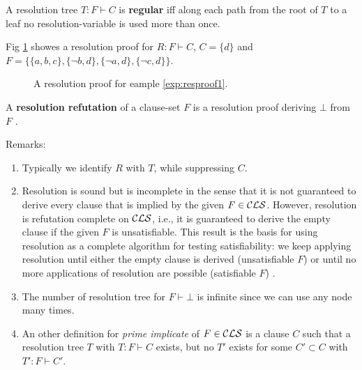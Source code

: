 \documentclass[12pt]{book}
\begin{document}
\begin{defi}\label{def:treg_ree}
   A resolution tree $T : F \vdash C$ is \textbf{regular} iff along each path from the root of $T$ to a leaf 
   no resolution-variable is used more than once. 
\end{defi}
 \begin{examp}\label{exp:resproof1}
      Fig \ref{fig:proof1} showes a resolution proof for  $R: F \vdash C$, $C=\{d\}$ and $F = \{\{a,b,c\},\{\neg b,d\},\{\neg a, d\},\{\neg c, d\}\}$. 
	   \begin{figure}
	   \centering  
	   \caption{A resolution proof for eample  \ref{exp:resproof1}.}
	   \label{fig:proof1}
       \end{figure}
\end{examp}

\begin{defi}\label{def:resrefutation}
  A \textbf{resolution refutation} of a clause-set $F$ is a resolution proof deriving $\bot$ from $F$ \cite{h5}. 
\end{defi}
  
Remarks:
\begin{enumerate}
      \item Typically we identify $R$ with $T$, while suppressing $C$.
	  \item Resolution is sound but is incomplete in the sense that it is not guaranteed to derive every clause that is implied by the given $F \in \mathcal{CLS}$. 
	  However, resolution is refutation complete on $\mathcal{CLS}$, i.e., it is guaranteed to derive the empty clause if the given $F$ is unsatisfiable. 
	  This result is the basis for using resolution as a complete algorithm for testing satisfiability: we keep applying resolution until either 
	  the empty clause is derived (unsatisfiable $F$) or until no more applications of resolution are possible (satisfiable $F$) \cite{h6}.
	  \item The number of resolution tree for $F \vdash \bot$ is infinite since we can use any node many times.
	  \item An other definition for \emph{prime implicate} of $F \in \mathcal{CLS}$ is a clause $C$ such that a resolution tree 
	  $T$ with $T: F \vdash C$ exists, but no $T'$ exists for some $C' \subset C$ with $T': F \vdash C'$.

\end{enumerate}
\end{document}
